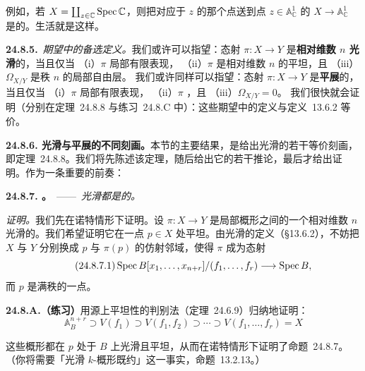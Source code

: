 例如，若 $X=\coprod_{z\in\mathbb{C}}\operatorname{Spec}\mathbb{C}$，则把对应于 $z$ 的那个点送到点 $z\in\mathbb{A}^1_{\mathbb{C}}$ 的\trMorphism{} $X\to\mathbb{A}^1_{\mathbb{C}}$ 是\trUnramified{}的。生活就是这样。

\textbf{24.8.5.}\ \emph{期望中的备选定义。}\quad 我们或许可以指望：态射 $\pi\colon X\to Y$ 是\textbf{相对维数 $n$ 光滑}的，当且仅当
（i）$\pi$ 局部有限表现，
（ii）$\pi$ 是相对维数 $n$ 的平坦，且
（iii）$\Omega_{X/Y}$ 是秩 $n$ 的局部自由层。
我们或许同样可以指望：态射 $\pi\colon X\to Y$ 是\textbf{平展}的，当且仅当
（i）$\pi$ 局部有限表现，
（ii）$\pi$ \trFlat，且
（iii）$\Omega_{X/Y}=0$。
我们很快就会证明（分别在\mbox{定理~24.8.8} 与\mbox{练习~24.8.C} 中）：这些期望中的定义与\mbox{定义~13.6.2} 等价。

\textbf{24.8.6. 光滑与平展\trMorphism{}的不同刻画。}\quad 本节的主要结果，是给出光滑\trMorphism{}的若干等价刻画，即\mbox{定理~24.8.8}。我们将先陈述该定理，随后给出它的若干推论，最后才给出证明。作为一条重要的前奏：

\textbf{24.8.7. \trhProposition。}\ ——\ \emph{光滑\trMorphism{}都是\trFlat{}的。}

\emph{证明。}\quad 我们先在诺特情形下证明。设 $\pi\colon X\to Y$ 是局部\trNoether{}概形之间的一个相对维数 $n$ 光滑的\trMorphism。我们希望证明它在一点 $p\in X$ 处平坦。由光滑\trMorphism{}的定义（\S13.6.2），不妨把 $X$ 与 $Y$ 分别换成 $p$ 与 $\pi(p)$ 的仿射邻域，使得 $\pi$ 成为态射
\[
\tag{24.8.7.1}\label{eq:smooth-affine-cover}
\operatorname{Spec} B[x_1,\dots,x_{n+r}]/(f_1,\dots,f_r)\longrightarrow\operatorname{Spec} B,
\]
而 $p$ 是\trJacobianMatrix{}满秩的一点。

\textbf{24.8.A.（练习）}\quad 用源上平坦性的\trSlicing{}判别法（\mbox{定理~24.6.9}）归纳地证明：
\[
\mathbb{A}^{n+r}_{B}\supset V(f_1)\supset V(f_1,f_2)\supset\cdots\supset V(f_1,\dots,f_r)=X
\]

这些概形都在 $p$ 处于 $B$ 上光滑且平坦，从而在诺特情形下证明了\mbox{命题~24.8.7}。（你将需要「光滑 $k$-概形既约」这一事实，\mbox{命题~13.2.13}。）

